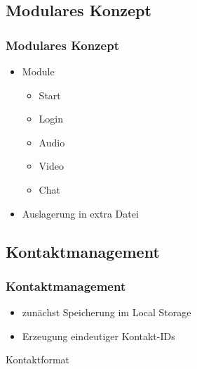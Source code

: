 \documentclass{beamer}
\begin{document}
\subsection{Modulares Konzept}
	\begin{frame}
		\frametitle{Modulares Konzept}
		
		\pause
		\begin{itemize}[<+->]
			\item Module
			\begin{itemize}[<1->]
				\item Start
				\item Login
				\item Audio
				\item Video
				\item Chat
			\end{itemize}
			\item Auslagerung in extra Datei
		\end{itemize}
		
		\pause
	\end{frame}

\subsection{Kontaktmanagement}
	\begin{frame}[fragile]
		\frametitle{Kontaktmanagement}
		\begin{itemize}
			\item zunächst Speicherung im Local Storage
			\item Erzeugung eindeutiger Kontakt-IDs
		\end{itemize}
		\pause
		\begin{exampleblock}{Kontaktformat}
		
		\end{exampleblock}
	\end{frame}
\end{document}
